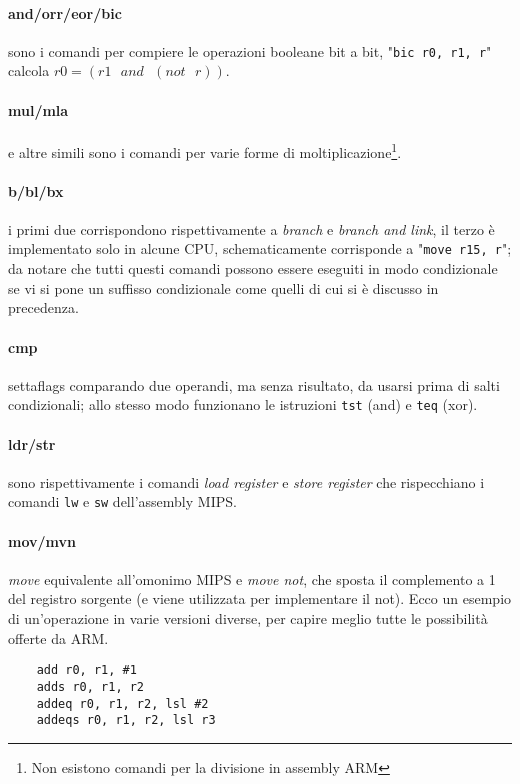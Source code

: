 \documentclass[class=book, crop=false]{standalone}
\begin{document}
\paragraph*{and/orr/eor/bic} sono i comandi per compiere le operazioni booleane bit a bit, "\texttt{bic r0, r1, r}" calcola $r0=(r1\text{ }and\text{ }(not\text{ }r))$.
\paragraph*{mul/mla} e altre simili sono i comandi per varie forme di moltiplicazione\footnote{Non esistono comandi per la divisione in assembly ARM}.
\paragraph*{b/bl/bx} i primi due corrispondono rispettivamente a \emph{branch} e \emph{branch and link}, il terzo è implementato solo in alcune CPU, schematicamente corrisponde a  "\texttt{move r15, r}"; da notare che tutti questi comandi possono essere eseguiti in modo condizionale se vi si pone un suffisso condizionale come quelli di cui si è discusso in precedenza.
\paragraph*{cmp} settaflags comparando due operandi, ma senza risultato, da usarsi prima di salti condizionali; allo stesso modo funzionano le istruzioni \texttt{tst} (and) e \texttt{teq} (xor).
\paragraph*{ldr/str} sono rispettivamente i comandi \emph{load register} e \emph{store register} che rispecchiano i comandi \texttt{lw} e \texttt{sw} dell'assembly MIPS.
\paragraph*{mov/mvn} \emph{move} equivalente all'omonimo MIPS e \emph{move not}, che sposta il complemento a 1 del registro sorgente (e viene utilizzata per implementare il not).
Ecco un esempio di un'operazione in varie versioni diverse, per capire meglio tutte le possibilità offerte da ARM.\\

\begin{verbatim}
	add r0, r1, #1
	adds r0, r1, r2
	addeq r0, r1, r2, lsl #2
	addeqs r0, r1, r2, lsl r3
\end{verbatim}
\end{document}
